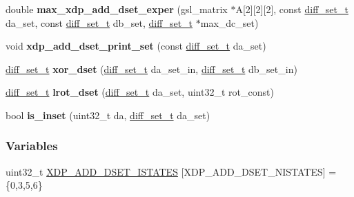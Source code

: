 \begin{DoxyCompactItemize}
\item 
\hypertarget{xdp-add-diff-set_8cc_ab3326ae987c725f0ae34087e12950be4}{double {\bfseries max\-\_\-xdp\-\_\-add\-\_\-dset\-\_\-exper} (gsl\-\_\-matrix $\ast$\-A\mbox{[}2\mbox{]}\mbox{[}2\mbox{]}\mbox{[}2\mbox{]}, const \hyperlink{structdiff__set__t}{diff\-\_\-set\-\_\-t} da\-\_\-set, const \hyperlink{structdiff__set__t}{diff\-\_\-set\-\_\-t} db\-\_\-set, \hyperlink{structdiff__set__t}{diff\-\_\-set\-\_\-t} $\ast$max\-\_\-dc\-\_\-set)}\label{xdp-add-diff-set_8cc_ab3326ae987c725f0ae34087e12950be4}

\item 
\hypertarget{xdp-add-diff-set_8cc_af9045051618f2fe9d38e517be1a2601a}{void {\bfseries xdp\-\_\-add\-\_\-dset\-\_\-print\-\_\-set} (const \hyperlink{structdiff__set__t}{diff\-\_\-set\-\_\-t} da\-\_\-set)}\label{xdp-add-diff-set_8cc_af9045051618f2fe9d38e517be1a2601a}

\item 
\hypertarget{xdp-add-diff-set_8cc_a385dcfdeeb5c4f79d461ed3692a2ac58}{\hyperlink{structdiff__set__t}{diff\-\_\-set\-\_\-t} {\bfseries xor\-\_\-dset} (\hyperlink{structdiff__set__t}{diff\-\_\-set\-\_\-t} da\-\_\-set\-\_\-in, \hyperlink{structdiff__set__t}{diff\-\_\-set\-\_\-t} db\-\_\-set\-\_\-in)}\label{xdp-add-diff-set_8cc_a385dcfdeeb5c4f79d461ed3692a2ac58}

\item 
\hypertarget{xdp-add-diff-set_8cc_af6e36c6f73b6132afd4a32a20b0404dd}{\hyperlink{structdiff__set__t}{diff\-\_\-set\-\_\-t} {\bfseries lrot\-\_\-dset} (\hyperlink{structdiff__set__t}{diff\-\_\-set\-\_\-t} da\-\_\-set, uint32\-\_\-t rot\-\_\-const)}\label{xdp-add-diff-set_8cc_af6e36c6f73b6132afd4a32a20b0404dd}

\item 
\hypertarget{xdp-add-diff-set_8cc_abb472748ae675f163774759d8fb53909}{bool {\bfseries is\-\_\-inset} (uint32\-\_\-t da, \hyperlink{structdiff__set__t}{diff\-\_\-set\-\_\-t} da\-\_\-set)}\label{xdp-add-diff-set_8cc_abb472748ae675f163774759d8fb53909}

\end{DoxyCompactItemize}
\subsubsection*{\-Variables}
\begin{DoxyCompactItemize}
\item 
uint32\-\_\-t \hyperlink{xdp-add-diff-set_8cc_ad4c6b8f71989229250c5721d60be9868}{\-X\-D\-P\-\_\-\-A\-D\-D\-\_\-\-D\-S\-E\-T\-\_\-\-I\-S\-T\-A\-T\-E\-S} \mbox{[}\-X\-D\-P\-\_\-\-A\-D\-D\-\_\-\-D\-S\-E\-T\-\_\-\-N\-I\-S\-T\-A\-T\-E\-S\mbox{]} = \{0,3,5,6\}
\end{DoxyCompactItemize}


